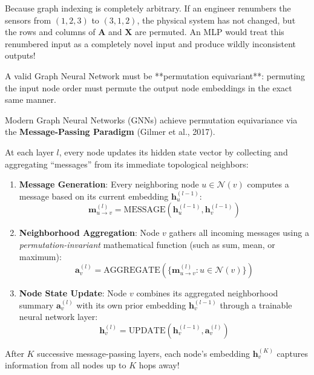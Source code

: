Because graph indexing is completely arbitrary. If an engineer renumbers the sensors from $(1, 2, 3)$ to $(3, 1, 2)$, the physical system has not changed, but the rows and columns of $\mathbf{A}$ and $\mathbf{X}$ are permuted. An MLP would treat this renumbered input as a completely novel input and produce wildly inconsistent outputs! 

A valid Graph Neural Network must be **permutation equivariant**: permuting the input node order must permute the output node embeddings in the exact same manner.

\begin{keyidea}
Modern Graph Neural Networks (GNNs) achieve permutation equivariance via the \textbf{Message-Passing Paradigm} (Gilmer et al., 2017). 

At each layer $l$, every node updates its hidden state vector by collecting and aggregating ``messages'' from its immediate topological neighbors:
\begin{enumerate}
    \item \textbf{Message Generation}: Every neighboring node $u \in \mathcal{N}(v)$ computes a message based on its current embedding $\mathbf{h}_u^{(l-1)}$:
    \begin{equation}
    \mathbf{m}_{u \to v}^{(l)} = \text{MESSAGE}\left(\mathbf{h}_u^{(l-1)}, \mathbf{h}_v^{(l-1)}\right)
    \end{equation}
    \item \textbf{Neighborhood Aggregation}: Node $v$ gathers all incoming messages using a \emph{permutation-invariant} mathematical function (such as sum, mean, or maximum):
    \begin{equation}
    \mathbf{a}_v^{(l)} = \text{AGGREGATE}\left(\{ \mathbf{m}_{u \to v}^{(l)} : u \in \mathcal{N}(v) \}\right)
    \end{equation}
    \item \textbf{Node State Update}: Node $v$ combines its aggregated neighborhood summary $\mathbf{a}_v^{(l)}$ with its own prior embedding $\mathbf{h}_v^{(l-1)}$ through a trainable neural network layer:
    \begin{equation}
    \mathbf{h}_v^{(l)} = \text{UPDATE}\left(\mathbf{h}_v^{(l-1)}, \mathbf{a}_v^{(l)}\right)
    \end{equation}
\end{enumerate}
After $K$ successive message-passing layers, each node's embedding $\mathbf{h}_v^{(K)}$ captures information from all nodes up to $K$ hops away!
\end{keyidea}

